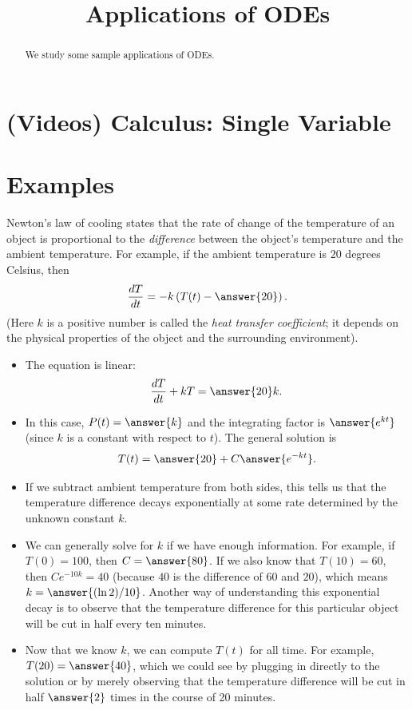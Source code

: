 \documentclass{ximera}
\title{Applications of ODEs}
\begin{document}
\begin{abstract}
We study some sample applications of ODEs.
\end{abstract}
\maketitle

\section*{(Videos) Calculus: Single Variable}


\section*{Examples}

\begin{example}
Newton's law of cooling states that the rate of change of the temperature of an object is proportional to the \textit{difference} between the object's temperature and the ambient temperature.
For example, if the ambient temperature is $20$ degrees Celsius, then
\[ \frac{dT}{dt} = -k \left( T(t) - \answer{20} \right). \]
(Here $k$ is a positive number is called the \textit{heat transfer coefficient}; it depends on the physical properties of the object and the surrounding environment).
\begin{itemize}
\item The equation is linear:
\[ \frac{dT}{dt} + k T = \answer{20} k. \]
\item In this case, $P(t) = \answer{k}$ and the integrating factor is $\answer{e^{k t}}$ (since $k$ is a constant with respect to $t$).  The general solution is
\[ T(t) = \answer{20} + C \answer{e^{-k t}}. \]
\item If we subtract ambient temperature from both sides, this tells us that the temperature difference decays exponentially at some rate determined by the unknown constant $k$.
\item We can generally solve for $k$ if we have enough information.  For example, if $T(0) = 100$, then $C = \answer{80}$.  If we also know that $T(10) = 60$, then $C e^{-10 k} = 40$ (because $40$ is the difference of $60$ and $20$), which means $k = \answer{(\ln 2)/10}$. Another way of understanding this exponential decay is to observe that the temperature difference for this particular object will be cut in half every ten minutes.
\item Now that we know $k$, we can compute $T(t)$ for all time. For example, $T(20) = \answer{40}$, which we could see by plugging in directly to the solution or by merely observing that the temperature difference will be cut in half $\answer{2}$ times in the course of 20 minutes.
\end{itemize}
\end{example}
\end{document}
